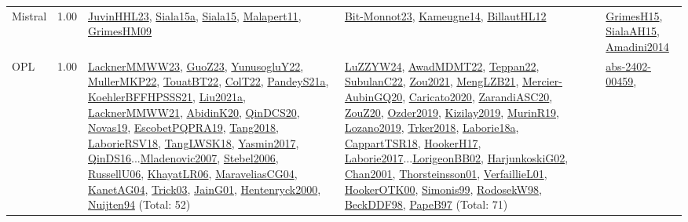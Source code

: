 {\begin{longtable}{p{3cm}r>{\raggedright\arraybackslash}p{6cm}>{\raggedright\arraybackslash}p{6cm}>{\raggedright\arraybackslash}p{8cm}}
\index{Mistral}\index{CPSystems!Mistral}Mistral &  1.00 & \hyperref[detail:JuvinHHL23]{JuvinHHL23}, \hyperref[detail:Siala15a]{Siala15a}, \hyperref[detail:Siala15]{Siala15}, \hyperref[detail:Malapert11]{Malapert11}, \hyperref[detail:GrimesHM09]{GrimesHM09} & \hyperref[detail:Bit-Monnot23]{Bit-Monnot23}, \hyperref[detail:Kameugne14]{Kameugne14}, \hyperref[detail:BillautHL12]{BillautHL12} & \hyperref[detail:GrimesH15]{GrimesH15}, \hyperref[detail:SialaAH15]{SialaAH15}, \hyperref[detail:Amadini2014]{Amadini2014}\\
\index{OPL}\index{CPSystems!OPL}OPL &  1.00 & \hyperref[detail:LacknerMMWW23]{LacknerMMWW23}, \hyperref[detail:GuoZ23]{GuoZ23}, \hyperref[detail:YunusogluY22]{YunusogluY22}, \hyperref[detail:MullerMKP22]{MullerMKP22}, \hyperref[detail:TouatBT22]{TouatBT22}, \hyperref[detail:ColT22]{ColT22}, \hyperref[detail:PandeyS21a]{PandeyS21a}, \hyperref[detail:KoehlerBFFHPSSS21]{KoehlerBFFHPSSS21}, \hyperref[detail:Liu2021a]{Liu2021a}, \hyperref[detail:LacknerMMWW21]{LacknerMMWW21}, \hyperref[detail:AbidinK20]{AbidinK20}, \hyperref[detail:QinDCS20]{QinDCS20}, \hyperref[detail:Novas19]{Novas19}, \hyperref[detail:EscobetPQPRA19]{EscobetPQPRA19}, \hyperref[detail:Tang2018]{Tang2018}, \hyperref[detail:LaborieRSV18]{LaborieRSV18}, \hyperref[detail:TangLWSK18]{TangLWSK18}, \hyperref[detail:Yasmin2017]{Yasmin2017}, \hyperref[detail:QinDS16]{QinDS16}...\hyperref[detail:Mladenovic2007]{Mladenovic2007}, \hyperref[detail:Stebel2006]{Stebel2006}, \hyperref[detail:RussellU06]{RussellU06}, \hyperref[detail:KhayatLR06]{KhayatLR06}, \hyperref[detail:MaraveliasCG04]{MaraveliasCG04}, \hyperref[detail:KanetAG04]{KanetAG04}, \hyperref[detail:Trick03]{Trick03}, \hyperref[detail:JainG01]{JainG01}, \hyperref[detail:Hentenryck2000]{Hentenryck2000}, \hyperref[detail:Nuijten94]{Nuijten94} (Total: 52) & \hyperref[detail:LuZZYW24]{LuZZYW24}, \hyperref[detail:AwadMDMT22]{AwadMDMT22}, \hyperref[detail:Teppan22]{Teppan22}, \hyperref[detail:SubulanC22]{SubulanC22}, \hyperref[detail:Zou2021]{Zou2021}, \hyperref[detail:MengLZB21]{MengLZB21}, \hyperref[detail:Mercier-AubinGQ20]{Mercier-AubinGQ20}, \hyperref[detail:Caricato2020]{Caricato2020}, \hyperref[detail:ZarandiASC20]{ZarandiASC20}, \hyperref[detail:ZouZ20]{ZouZ20}, \hyperref[detail:Ozder2019]{Ozder2019}, \hyperref[detail:Kizilay2019]{Kizilay2019}, \hyperref[detail:MurinR19]{MurinR19}, \hyperref[detail:Lozano2019]{Lozano2019}, \hyperref[detail:Trker2018]{Trker2018}, \hyperref[detail:Laborie18a]{Laborie18a}, \hyperref[detail:CappartTSR18]{CappartTSR18}, \hyperref[detail:HookerH17]{HookerH17}, \hyperref[detail:Laborie2017]{Laborie2017}...\hyperref[detail:LorigeonBB02]{LorigeonBB02}, \hyperref[detail:HarjunkoskiG02]{HarjunkoskiG02}, \hyperref[detail:Chan2001]{Chan2001}, \hyperref[detail:Thorsteinsson01]{Thorsteinsson01}, \hyperref[detail:VerfaillieL01]{VerfaillieL01}, \hyperref[detail:HookerOTK00]{HookerOTK00}, \hyperref[detail:Simonis99]{Simonis99}, \hyperref[detail:RodosekW98]{RodosekW98}, \hyperref[detail:BeckDDF98]{BeckDDF98}, \hyperref[detail:PapeB97]{PapeB97} (Total: 71) & \hyperref[detail:abs-2402-00459]{abs-2402-00459}, 
\end{longtable}}

